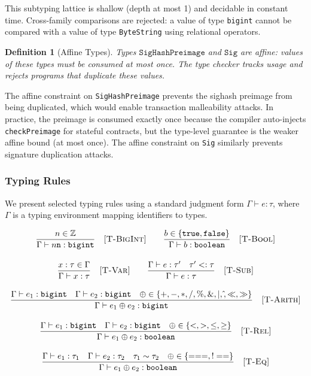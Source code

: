 \documentclass[11pt,a4paper]{article}
\newtheorem{definition}[theorem]{Definition}
\newcommand{\bs}{\texttt{ByteString}}
\newcommand{\bigintty}{\texttt{bigint}}
\newcommand{\boolty}{\texttt{boolean}}
\newcommand{\subtype}{\mathrel{<:}}
\begin{document}
This subtyping lattice is shallow (depth at most 1) and decidable in constant
time. Cross-family comparisons are rejected: a value of type \bigintty{}
cannot be compared with a value of type \bs{} using relational operators.

\begin{definition}[Affine Types]
Types $\texttt{SigHashPreimage}$ and $\texttt{Sig}$ are \emph{affine}: values
of these types must be consumed at most once. The type checker tracks usage
and rejects programs that duplicate these values.
\end{definition}

The affine constraint on \texttt{SigHashPreimage} prevents the sighash
preimage from being duplicated, which would enable transaction malleability
attacks. In practice, the preimage is consumed exactly once because the
compiler auto-injects \texttt{checkPreimage} for stateful contracts, but the
type-level guarantee is the weaker affine bound (at most once).
The affine constraint on \texttt{Sig} similarly prevents
signature duplication attacks.

\subsubsection{Typing Rules}

We present selected typing rules using a standard judgment form
$\Gamma \vdash e : \tau$, where $\Gamma$ is a typing environment mapping
identifiers to types.

\begin{gather}
\frac{n \in \mathbb{Z}}{\Gamma \vdash n\texttt{n} : \bigintty}
\quad \textsc{[T-BigInt]}
\qquad
\frac{b \in \{\texttt{true}, \texttt{false}\}}{\Gamma \vdash b : \boolty}
\quad \textsc{[T-Bool]}
\\[1em]
\frac{x : \tau \in \Gamma}{\Gamma \vdash x : \tau}
\quad \textsc{[T-Var]}
\qquad
\frac{\Gamma \vdash e : \tau' \quad \tau' \subtype \tau}{\Gamma \vdash e : \tau}
\quad \textsc{[T-Sub]}
\\[1em]
\frac{
  \Gamma \vdash e_1 : \bigintty \quad
  \Gamma \vdash e_2 : \bigintty \quad
  \oplus \in \{+, -, *, /, \%, \mathbin{\&}, |, \hat{}, \ll, \gg\}
}{
  \Gamma \vdash e_1 \oplus e_2 : \bigintty
}
\quad \textsc{[T-Arith]}
\\[1em]
\frac{
  \Gamma \vdash e_1 : \bigintty \quad
  \Gamma \vdash e_2 : \bigintty \quad
  \oplus \in \{<, >, \leq, \geq\}
}{
  \Gamma \vdash e_1 \oplus e_2 : \boolty
}
\quad \textsc{[T-Rel]}
\\[1em]
\frac{
  \Gamma \vdash e_1 : \tau_1 \quad
  \Gamma \vdash e_2 : \tau_2 \quad
  \tau_1 \sim \tau_2 \quad
  \oplus \in \{===, !==\}
}{
  \Gamma \vdash e_1 \oplus e_2 : \boolty
}
\quad \textsc{[T-Eq]}
\end{gather}
\end{document}
